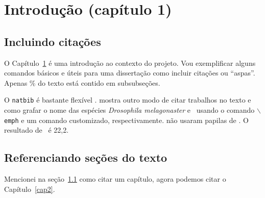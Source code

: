 \renewcommand{\partname}{}
\renewcommand{\chaptername}{}
\renewcommand{\thechapter}{}
\renewcommand{\thesection}{}


\cleardoublepage

\pagestyle{fancy}


\chapter{Introdução (capítulo 1)}\label{intro}

\section{Incluindo citações}\label{intro:historico}

O Capítulo~\ref{intro} é uma introdução ao contexto do projeto.
Vou exemplificar alguns comandos básicos e úteis para uma dissertação como incluir citações \citep{Sand-Jensen2007} ou ``aspas''.
Apenas \unit[4]{\%} do texto está contido em subsubseções.

O \texttt{natbib} é bastante flexível \citep[ver detalhes em][]{Kirk2008}.
\citet{Emlet1987} mostra outro modo de citar trabalhos no texto e como grafar o nome das espécies \emph{Drosophila melagonaster} e \subde\ usando o comando \texttt{$\backslash$emph} e um comando customizado, respectivamente.
\citet{Day2006} não usaram papilas de \subsus.
O resultado de \subsus\ é 22,2.

\section{Referenciando seções do texto}\label{intro:contexto}

Mencionei na seção~\ref{intro:historico} como citar um capítulo, agora podemos citar o Capítulo~\ref{cap2}.
